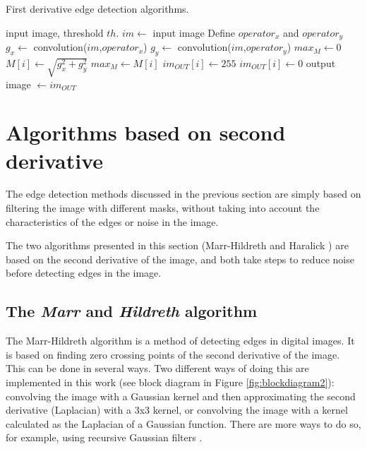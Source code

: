 \documentclass{ipol}
\numberwithin{equation}{section}
\numberwithin{table}{section}
\begin{document}
{\begin{algorithm}[t]
\caption{First derivative edge detection algorithms.}
\label{algo:fded}
\begin{algorithmic}[1]
\REQUIRE input image, threshold $th$.
\STATE $im \leftarrow$ input image
\STATE Define $operator_x$ and $operator_y$ 
\STATE $g_x \leftarrow$ convolution($im$,$operator_x$)
\STATE $g_y \leftarrow$ convolution($im$,$operator_y$)
\STATE $max_M \leftarrow 0$
	\STATE $M[i] \leftarrow \sqrt{g_x^2+g_y^2}$ 
		\STATE $max_M \leftarrow M[i]$
	\ENDIF
\ENDFOR
{}
		\STATE $im_{OUT}[i] \leftarrow 255$
	\ELSE
		\STATE $im_{OUT}[i] \leftarrow 0$
	\ENDIF
\ENDFOR
\RETURN output image $\leftarrow im_{OUT}$
\end{algorithmic}
\end{algorithm}


\section{Algorithms based on second derivative}
\label{sec:second}

The edge detection methods discussed in the previous section are simply based on filtering the 
image with different masks, without taking into account the characteristics of the edges or 
noise in the image. 

The two algorithms presented in this section (Marr-Hildreth \cite{AIM-518} and Haralick \cite{bb20239}) 
are based on the second derivative of the image, and both take steps to reduce noise before 
detecting edges in the image.


\subsection{The \textit{Marr} and \textit{Hildreth} algorithm}

The Marr-Hildreth algorithm is a method of detecting edges in digital 
images. It is based on finding zero crossing points of the second derivative
of the image. This can be done in several ways. Two different ways of doing 
this are implemented in this work (see block diagram in Figure 
\ref{fig:blockdiagram2}): convolving the image with a Gaussian kernel and then 
approximating the second derivative (Laplacian) with a 3x3 kernel, or 
convolving the image with a kernel calculated as the Laplacian of a 
Gaussian function. There are more ways to do so, for example, using 
recursive Gaussian filters \cite{Deriche1993Recursively}. 

}
\end{document}
